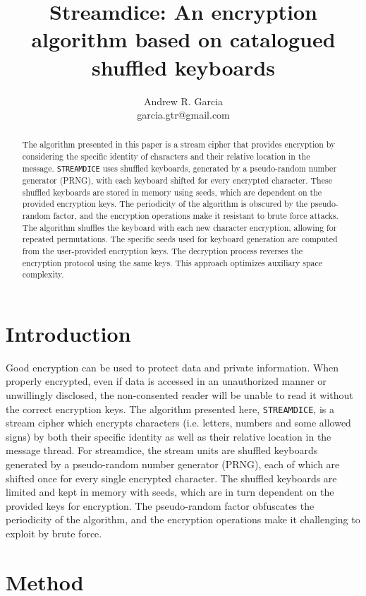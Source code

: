 \documentclass{article}
\title{Streamdice: An encryption algorithm based on catalogued shuffled keyboards}
\author{Andrew R. Garcia\\garcia.gtr@gmail.com}
\date{}
\begin{document}
\maketitle

\begin{abstract}
The algorithm presented in this paper is a stream cipher that provides encryption by considering the specific 
identity of characters and their relative location in the message. \texttt{STREAMDICE} uses shuffled keyboards,
generated by a pseudo-random number generator (PRNG), with each keyboard shifted for every encrypted character. 
These shuffled keyboards are stored in memory using seeds, which are dependent on the provided encryption keys. 
The periodicity of the algorithm is obscured by the pseudo-random factor, and the encryption operations make it resistant to brute force attacks. 
The algorithm shuffles the keyboard with each new character encryption, allowing for repeated permutations. 
The specific seeds used for keyboard generation are computed from the user-provided encryption keys. 
The decryption process reverses the encryption protocol using the same keys. This approach optimizes auxiliary space complexity.

\end{abstract}

\section{Introduction}
Good encryption can be used to protect data and private information. 
When properly encrypted, even if data is accessed in an unauthorized manner or unwillingly disclosed, 
the non-consented reader will be unable to read it without the correct encryption keys. The algorithm presented here, \texttt{STREAMDICE}, 
is a stream cipher which encrypts characters (i.e. letters, numbers and some allowed signs) by both their specific identity as well as their 
relative location in the message thread. For streamdice, the stream units are shuffled keyboards generated by a pseudo-random number generator
(PRNG), each of which are shifted once for every single encrypted character. The shuffled keyboards are limited and kept in memory
with seeds, which are in turn dependent on the provided keys for encryption. The pseudo-random factor obfuscates the periodicity 
of the algorithm, and the encryption operations make it challenging to exploit by brute force.

\section{Method}
\end{document}
